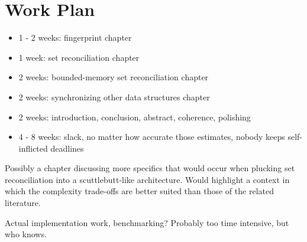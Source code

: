 \documentclass{article}
\begin{document}
\section{Work Plan}

\begin{itemize}
\item 1 - 2 weeks: fingerprint chapter
\item 1 week: set reconciliation chapter
\item 2 weeks: bounded-memory set reconciliation chapter
\item 2 weeks: synchronizing other data structures chapter
\item 2 weeks: introduction, conclusion, abstract, coherence, polishing
\item 4 - 8 weeks: slack, no matter how accurate those estimates, nobody keeps self-inflicted deadlines
\end{itemize}

Possibly a chapter discussing more specifics that would occur when plucking set reconciliation into a scuttlebutt-like architecture. Would highlight a context in which the complexity trade-offs are better suited than those of the related literature.

Actual implementation work, benchmarking? Probably too time intensive, but who knows.



\end{document}
